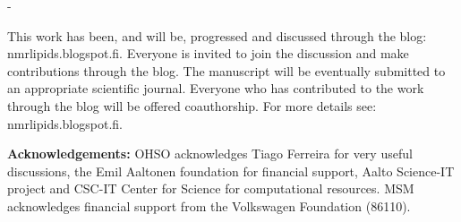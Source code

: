 \documentclass[pre,aps,floatfix,authordate1-4,twocolumn]{revtex4-1}
\begin{document}

-  











This work has been, and will be, progressed and discussed through the blog: nmrlipids.blogspot.fi. 
Everyone is invited to join the discussion and make contributions through the blog. 
The manuscript will be eventually submitted to an appropriate scientific journal. 
Everyone who has contributed to the work through the blog will be offered 
coauthorship. For more details see: nmrlipids.blogspot.fi.   

{\bf Acknowledgements: }
OHSO acknowledges Tiago Ferreira for very useful discussions, the Emil Aaltonen foundation for financial support, Aalto Science-IT project and CSC-IT Center for Science for computational resources. 
%
MSM acknowledges financial support from the Volkswagen Foundation (86110).
\end{document}

